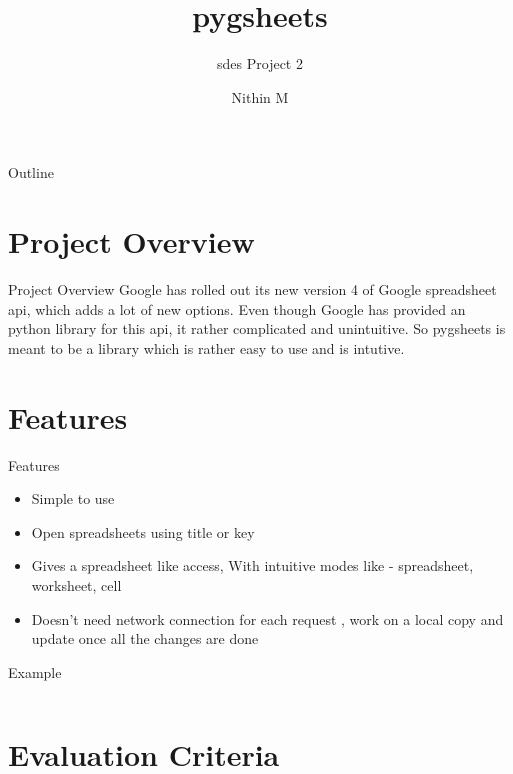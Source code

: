 \documentclass{beamer}
\title{pygsheets}
\subtitle{sdes Project 2}
\author{Nithin M}
\begin{document}
\begin{frame}
  \titlepage
\end{frame}


\begin{frame}{Outline}
  \tableofcontents
\end{frame}


\section{Project Overview}

\begin{frame}{Project Overview}
  Google has rolled out its new version 4 of Google spreadsheet api, which adds a lot of new options. Even though Google has provided an python library for this api, it rather complicated and unintuitive. So pygsheets is meant to be a library which is rather easy to use and is intutive.
\end{frame}

\section{Features}

\begin{frame}{Features}
  \begin{itemize}
  \item {
     Simple to use
  }
  \item {
    Open spreadsheets using title or key
  }
  \item {
    Gives a spreadsheet like access, With intuitive modes like - spreadsheet, worksheet, cell
  }
  \item {
    Doesn't need network connection for each request , work on a local copy and update once all the changes are done
  }
  \end{itemize}
\end{frame}


\begin{frame}{Example}
    \inputminted{python}{eg.py}
\end{frame}



\section{Evaluation Criteria}
\end{document}

